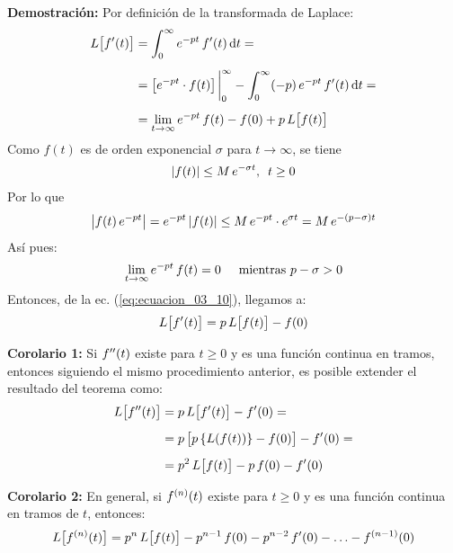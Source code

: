 \noindent \textbf{Demostración:} Por definición de la transformada de Laplace:
\begin{align}
\begin{aligned}[b]
L \big[\ptilde{f}(t)\big] &= \int_{0}^{\infty} e^{-p t} \, \ptilde{f} (t) \dd{t} = \\[0.5em]
&= \big[e^{-p t} \cdot f(t)\big] \eval_{0}^{\infty} - \int_{0}^{\infty} (-p) \, e^{-p t} \, \ptilde{f} (t) \dd{t} = \\[0.5em]
&= \lim_{t \to \infty} e^{-p t} \, f(t) - f(0) + p \, L \big[f(t)\big]
\end{aligned}
\label{eq:ecuacion_03_10}
\end{align}
Como $f(t)$ es de orden exponencial $\sigma$ para $t \to \infty$, se tiene
\begin{align*}
\abs{f(t)} \leq M \, e^{-\sigma t}, \hspace{0.5em} t \geq 0
\end{align*}
Por lo que
\begin{align*}
\abs{f(t) \, e^{-p t}} = e^{-p t} \, \abs{f(t)} \leq M \, e^{-p t} \cdot e^{\sigma t} = M \, e^{-(p - \sigma) t}
\end{align*}
Así pues:
\begin{align*}
\lim_{t \to \infty} e^{-p t} \, f(t) = 0 \hspace{0.5cm} \mbox{mientras  } p - \sigma > 0
\end{align*}
Entonces, de la ec. (\ref{eq:ecuacion_03_10}), llegamos a:
\begin{align}
L \big[{f}^{\prime}(t)\big] = p \, L \big[f(t)\big] - f(0)
\label{eq:ecuacion_03_11}
\end{align}

\noindent \textbf{Corolario 1: } Si ${f}^{\prime \prime}(t)$ existe para $t \geq 0$ y es una función continua en tramos, entonces siguiendo el mismo procedimiento anterior, es posible extender el resultado del teorema como:
\begin{align}
\begin{aligned}[b]
L \big[{f}^{\prime \prime}(t)\big] &= p \, L \big[{f}^{\prime}(t)\big] - {f}^{\prime}(0) = \\[0.5em]
&= p \, \big[p \left\{ L (f(t)) \right\} - f(0) \big] - {f}^{\prime} (0) = \\[0.5em]
&= p^{2} \, L \big[f(t)\big] - p \, f(0) - {f}^{\prime}(0)
\end{aligned}
\label{eq:ecuacion_03_12}
\end{align}

\noindent \textbf{Corolario 2:} En general, si ${f}^{(n)}(t)$ existe para $t \geq 0$ y es una función continua en tramos de $t$, entonces:
\begin{align}
L \big[{f}^{(n)}(t)\big] = p^{n} \, L \big[f(t)\big] - p^{n-1} \, f(0) - p^{n-2} \, {f}^{\prime}(0) - \ldots - {f}^{(n-1)} (0)
\label{eq:ecuacion_03_13}
\end{align}

